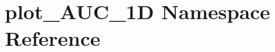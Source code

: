 \hypertarget{namespaceplot__AUC__1D}{
\section{plot\_\-AUC\_\-1D Namespace Reference}
\label{namespaceplot__AUC__1D}
}
